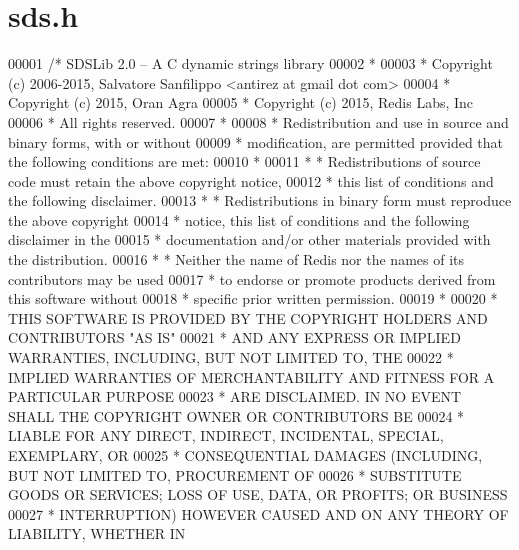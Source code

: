 \hypertarget{sds_8h_source}{}\section{sds.\+h}
\label{sds_8h_source}

\begin{DoxyCode}
00001 \textcolor{comment}{/* SDSLib 2.0 -- A C dynamic strings library}
00002 \textcolor{comment}{ *}
00003 \textcolor{comment}{ * Copyright (c) 2006-2015, Salvatore Sanfilippo <antirez at gmail dot com>}
00004 \textcolor{comment}{ * Copyright (c) 2015, Oran Agra}
00005 \textcolor{comment}{ * Copyright (c) 2015, Redis Labs, Inc}
00006 \textcolor{comment}{ * All rights reserved.}
00007 \textcolor{comment}{ *}
00008 \textcolor{comment}{ * Redistribution and use in source and binary forms, with or without}
00009 \textcolor{comment}{ * modification, are permitted provided that the following conditions are met:}
00010 \textcolor{comment}{ *}
00011 \textcolor{comment}{ *   * Redistributions of source code must retain the above copyright notice,}
00012 \textcolor{comment}{ *     this list of conditions and the following disclaimer.}
00013 \textcolor{comment}{ *   * Redistributions in binary form must reproduce the above copyright}
00014 \textcolor{comment}{ *     notice, this list of conditions and the following disclaimer in the}
00015 \textcolor{comment}{ *     documentation and/or other materials provided with the distribution.}
00016 \textcolor{comment}{ *   * Neither the name of Redis nor the names of its contributors may be used}
00017 \textcolor{comment}{ *     to endorse or promote products derived from this software without}
00018 \textcolor{comment}{ *     specific prior written permission.}
00019 \textcolor{comment}{ *}
00020 \textcolor{comment}{ * THIS SOFTWARE IS PROVIDED BY THE COPYRIGHT HOLDERS AND CONTRIBUTORS "AS IS"}
00021 \textcolor{comment}{ * AND ANY EXPRESS OR IMPLIED WARRANTIES, INCLUDING, BUT NOT LIMITED TO, THE}
00022 \textcolor{comment}{ * IMPLIED WARRANTIES OF MERCHANTABILITY AND FITNESS FOR A PARTICULAR PURPOSE}
00023 \textcolor{comment}{ * ARE DISCLAIMED. IN NO EVENT SHALL THE COPYRIGHT OWNER OR CONTRIBUTORS BE}
00024 \textcolor{comment}{ * LIABLE FOR ANY DIRECT, INDIRECT, INCIDENTAL, SPECIAL, EXEMPLARY, OR}
00025 \textcolor{comment}{ * CONSEQUENTIAL DAMAGES (INCLUDING, BUT NOT LIMITED TO, PROCUREMENT OF}
00026 \textcolor{comment}{ * SUBSTITUTE GOODS OR SERVICES; LOSS OF USE, DATA, OR PROFITS; OR BUSINESS}
00027 \textcolor{comment}{ * INTERRUPTION) HOWEVER CAUSED AND ON ANY THEORY OF LIABILITY, WHETHER IN}

\end{DoxyCode}

